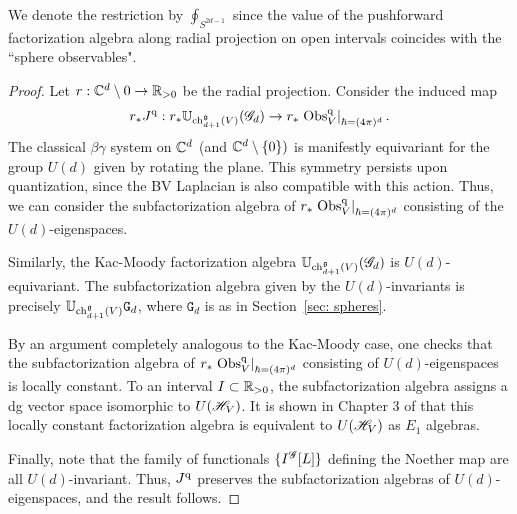 We denote the restriction by $\oint_{S^{2d-1}}$ since the value of the pushforward factorization algebra along radial projection on open intervals coincides with the ``sphere observables".

\begin{proof}
Let $r : \mathbb C^d \setminus 0 \to \mathbb R_{>0}$ be the radial projection. 
Consider the induced map
\[
r_* J^{\rm q} :  r_* \mathbb U_{{\rm ch}_{d+1}^\mathfrak g(V)} (\mathscr G_d) \to  r_* \left. {\rm Obs}^{\rm q}_V \right|_{\hbar = (4\pi)^d}  .
\]
The classical $\beta\gamma$ system on $\mathbb C^d$ (and $\mathbb C^d \setminus \{0\})$ is manifestly equivariant for the group $U(d)$ given by rotating the plane. 
This symmetry persists upon quantization, since the BV Laplacian is also compatible with this action. 
Thus, we can consider the subfactorization algebra of $r_* \left. {\rm Obs}^{\rm q}_V \right|_{\hbar = (4\pi)^d}$ consisting of the $U(d)$-eigenspaces. 

Similarly, the Kac-Moody factorization algebra $\mathbb U_{{\rm ch}_{d+1}^\mathfrak g(V)} (\mathscr G_d)$ is $U(d)$-equivariant. 
The subfactorization algebra given by the $U(d)$-invariants is precisely $\mathbb U_{{\rm ch}_{d+1}^\mathfrak g(V)} \mathtt{G}_d$, where $\mathtt{G}_d$ is as in Section~\ref{sec: spheres}. 

By an argument completely analogous to the Kac-Moody case, one checks that the subfactorization algebra of $r_* \left. {\rm Obs}^{\rm q}_V \right|_{\hbar = (4\pi)^d}$ consisting of $U(d)$-eigenspaces is locally constant.
To an interval $I \subset \mathbb R_{>0}$, the subfactorization algebra assigns a dg vector space isomorphic to $U(\mathscr H_V)$. 
It is shown in Chapter 3 of \cite{BWthesis} that this locally constant factorization algebra is equivalent to $U(\mathscr H_V)$ as $E_1$ algebras. 

Finally, note that the family of functionals $\{I^{\mathscr G}[L]\}$ defining the Noether map are all $U(d)$-invariant.
Thus, $J^{\rm q}$ preserves the subfactorization algebras of $U(d)$-eigenspaces, and the result follows.
\end{proof}
